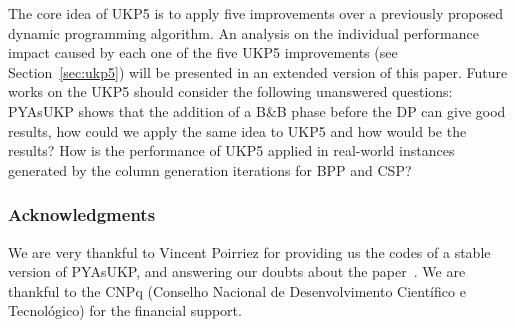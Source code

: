 \documentclass[runningheads,a4paper]{llncs}
\begin{document}
The core idea of UKP5 is to apply five improvements over a previously proposed dynamic programming algorithm.
An analysis on the individual performance impact caused by each one of the five UKP5 improvements (see Section~\ref{sec:ukp5}) will be presented in an extended version of this paper. 
Future works on the UKP5 should consider the following unanswered questions:
PYAsUKP shows that the addition of a B\&B phase before the DP can give good results, how could we apply the same idea to UKP5 and how would be the results?
How is the performance of UKP5 applied in real-world instances generated by the column generation iterations for BPP and CSP?

\subsubsection{Acknowledgments}

We are very thankful to Vincent Poirriez for providing us the codes of a stable version of PYAsUKP, and answering our doubts about the paper~\cite{pya}. 
We are thankful to the CNPq (Conselho Nacional de Desenvolvimento Cient\'ifico e Tecnol\'ogico) for the financial support.
\end{document}
